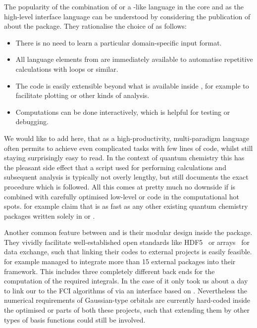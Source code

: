 The popularity of the combination of \fortran or a \ccc-like
language in the core and \python as the high-level interface language
can be understood by considering the publication of \citet{Sun2017}
about the \pyscf package.
They rationalise the choice of \python as follows:
\begin{itemize}
	\item There is no need to learn a particular domain-specific
		input format.
	\item All language elements from \python are immediately
		available to \eg automatise repetitive calculations
		with loops or similar.
	\item The code is easily extensible beyond what is available
		inside \pyscf, for example to facilitate plotting
		or other kinds of analysis.
	\item Computations can be done interactively,
		which is helpful for testing or debugging.
\end{itemize}
We would like to add here,
that \python as a high-productivity, multi-paradigm language
often permits to achieve even complicated tasks with few lines of code,
whilst still staying surprisingly easy to read.
In the context of quantum chemistry
this has the pleasant side effect that a \python script
used for performing calculations and subsequent analysis
is typically not overly lengthy,
but still documents the exact procedure which is followed.
All this comes at pretty much no downside
if \python is combined with
carefully optimised low-level \ccc or \fortran
code in the computational hot spots.
\citet{Sun2017} for example claim that \pyscf is as
fast as any other existing quantum chemistry packages
written solely in \ccc or \fortran.

Another common feature between \pyscf and \psifour
is their modular design inside the package.
They vividly facilitate well-established open standards
like HDF5~\cite{HDF5Manual} or \numpy arrays~\cite{Walt2011}
for data exchange,
such that linking their codes to external projects is easily feasible.
\psifour for example managed to integrate more than 15 external packages
into their framework.
This includes three completely different back ends for the computation of the
required integrals.
In the case of \pyscf it only took us about a day to link
our \molsturm to the FCI algorithms of \pyscf
via an interface based on \numpy.
Nevertheless the numerical requirements of Gaussian-type orbitals
are currently hard-coded inside the optimised
\ccc or \cpp parts of both these projects,
such that extending them by other types of basis functions could still be involved.

